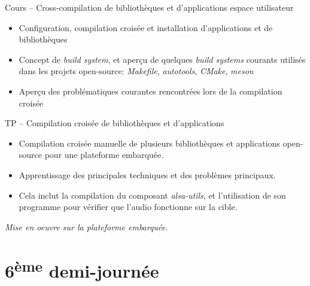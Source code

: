 \documentclass[a4paper,12pt,obeyspaces,spaces,hyphens]{article}
\begin{document}
\feagendatwocolumn
{Cours – Cross-compilation de bibliothèques et d'applications espace utilisateur}
{
  \begin{itemize}
  \item Configuration, compilation croisée et installation
    d'applications et de bibliothèques
  \item Concept de {\em build system}, et aperçu de quelques {\em
      build systems} courants utilisés dans les projets open-source:
    {\em Makefile}, {\em autotools}, {\em CMake}, {\em meson}
  \item Aperçu des problématiques courantes rencontrées lors de la
    compilation croisée
  \end{itemize}
}
{TP – Compilation croisée de bibliothèques et d'applications}
{
  \begin{itemize}
  \item Compilation croisée manuelle de plusieurs bibliothèques et
    applications open-source pour une plateforme embarquée.
  \item Apprentissage des principales techniques et des problèmes
    principaux.
  \item Cela inclut la compilation du composant {\em alsa-utils},
     et l'utilisation de son programme  pour
     vérifier que l'audio fonctionne sur la cible.
  \end{itemize}

  \vspace{0.5cm}
  {\em Mise en oeuvre sur la plateforme embarquée.}
}

\section{6\textsuperscript{ème} demi-journée}
\end{document}
